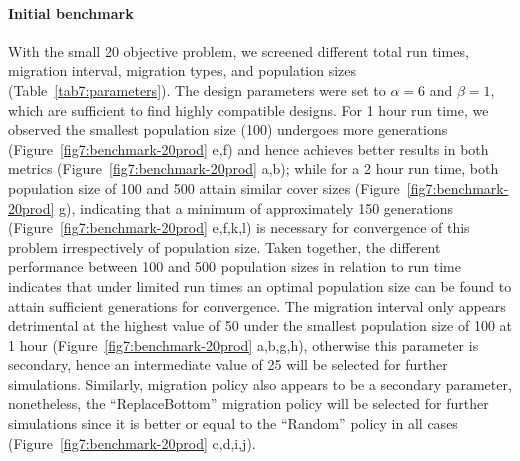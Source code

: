 \documentclass[12pt]{article}
\begin{document}
{\paragraph{Initial benchmark}
With the small 20 objective problem, we screened different total run times, migration interval, migration types, and population sizes (Table~\ref{tab7:parameters}). The design parameters were set to $\alpha=6$ and $\beta=1$, which are sufficient to find highly compatible designs.\citep{garcia2019d}
For 1 hour run time, we observed the smallest population size (100) undergoes more generations (Figure~\ref{fig7:benchmark-20prod} e,f) and hence achieves better results in both metrics (Figure~\ref{fig7:benchmark-20prod} a,b); while for a 2 hour run time, both population size of 100 and 500 attain similar cover sizes (Figure~\ref{fig7:benchmark-20prod} g), indicating that a minimum of approximately 150 generations (Figure~\ref{fig7:benchmark-20prod} e,f,k,l) is necessary for convergence of this problem irrespectively of population size.
Taken together, the different performance between 100 and 500 population sizes in relation to run time indicates that under limited run times an optimal population size can be found to attain sufficient generations for convergence.
The migration interval only appears detrimental at the highest value of 50 under the smallest population size of 100 at 1 hour (Figure~\ref{fig7:benchmark-20prod} a,b,g,h), otherwise this parameter is secondary, hence an intermediate value of 25 will be selected for further simulations. Similarly, migration policy also appears to be a secondary parameter, nonetheless, the ``ReplaceBottom'' migration policy will be selected for further simulations since it is better or equal to the ``Random'' policy in all cases (Figure~\ref{fig7:benchmark-20prod} c,d,i,j).

}
\end{document}
